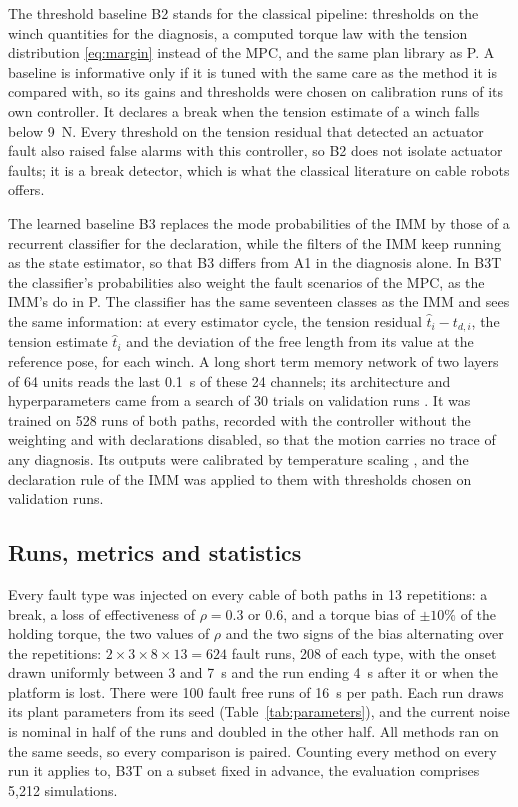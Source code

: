 \documentclass[a4paper,fleqn]{cas-dc}
\newcommand{\tablefile}[1]{\IfFileExists{tables/#1.tex}{}{}}
\begin{document}
\tablefile{tab_methods}

The threshold baseline B2 stands for the classical pipeline: thresholds on the winch quantities for the diagnosis, a computed torque law with the tension distribution \eqref{eq:margin} instead of the MPC, and the same plan library as P. A baseline is informative only if it is tuned with the same care as the method it is compared with, so its gains and thresholds were chosen on calibration runs of its own controller. It declares a break when the tension estimate of a winch falls below 9~N. Every threshold on the tension residual that detected an actuator fault also raised false alarms with this controller, so B2 does not isolate actuator faults; it is a break detector, which is what the classical literature on cable robots offers.

The learned baseline B3 replaces the mode probabilities of the IMM by those of a recurrent classifier for the declaration, while the filters of the IMM keep running as the state estimator, so that B3 differs from A1 in the diagnosis alone. In B3T the classifier's probabilities also weight the fault scenarios of the MPC, as the IMM's do in P. The classifier has the same seventeen classes as the IMM and sees the same information: at every estimator cycle, the tension residual $\hat t_i-t_{d,i}$, the tension estimate $\hat t_i$ and the deviation of the free length from its value at the reference pose, for each winch. A long short term memory network \citep{hochreiter1997lstm} of two layers of 64 units reads the last 0.1~s of these 24 channels; its architecture and hyperparameters came from a search of 30 trials on validation runs \citep{akiba2019optuna}. It was trained on 528 runs of both paths, recorded with the controller without the weighting and with declarations disabled, so that the motion carries no trace of any diagnosis. Its outputs were calibrated by temperature scaling \citep{guo2017calibration}, and the declaration rule of the IMM was applied to them with thresholds chosen on validation runs.

\subsection{Runs, metrics and statistics}\label{sec:protocol}

Every fault type was injected on every cable of both paths in 13 repetitions: a break, a loss of effectiveness of $\rho=0.3$ or 0.6, and a torque bias of $\pm10\%$ of the holding torque, the two values of $\rho$ and the two signs of the bias alternating over the repetitions: $2\times3\times8\times13=624$ fault runs, 208 of each type, with the onset drawn uniformly between 3 and 7~s and the run ending 4~s after it or when the platform is lost. There were 100 fault free runs of 16~s per path. Each run draws its plant parameters from its seed (Table~\ref{tab:parameters}), and the current noise is nominal in half of the runs and doubled in the other half. All methods ran on the same seeds, so every comparison is paired. Counting every method on every run it applies to, B3T on a subset fixed in advance, the evaluation comprises 5,212 simulations.
\end{document}
